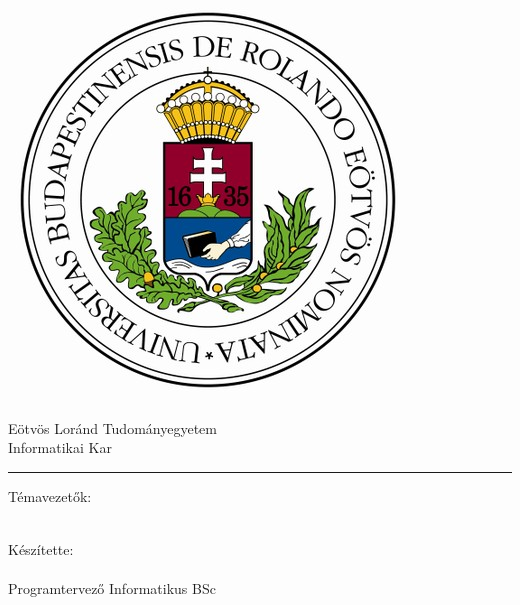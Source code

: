 \begin{titlepage}

\begin{minipage}{0.40\linewidth}
\includegraphics[scale=0.3]{img/elte-cimer}
\end{minipage}
\begin{minipage}{0.50\linewidth}
\begin{center}
Eötvös Loránd Tudományegyetem \\
Informatikai Kar \\
\TANSZEK
\end{center}
\end{minipage}

\hrule
\vfill

\begin{center}
\Huge
\textbf{\CIM}
\normalsize
\end{center}

\vfill

\begin{minipage}[t]{0.5\linewidth}
\noindent
Témavezetők:\\
\textbf{\TEMAVEZETO} \hfill \textbf{\TEMAVEZETTO}\\
\TEMAVEZETOBEOSZTAS  \hfill \TEMAVEZETTOBEOSZTAS
\end{minipage}
\begin{minipage}[t]{0.5\linewidth}
\begin{flushright}
Készítette: \\
\textbf{\SZERZO} \\
Programtervező Informatikus BSc
\end{flushright}
\end{minipage}


\end{titlepage}

